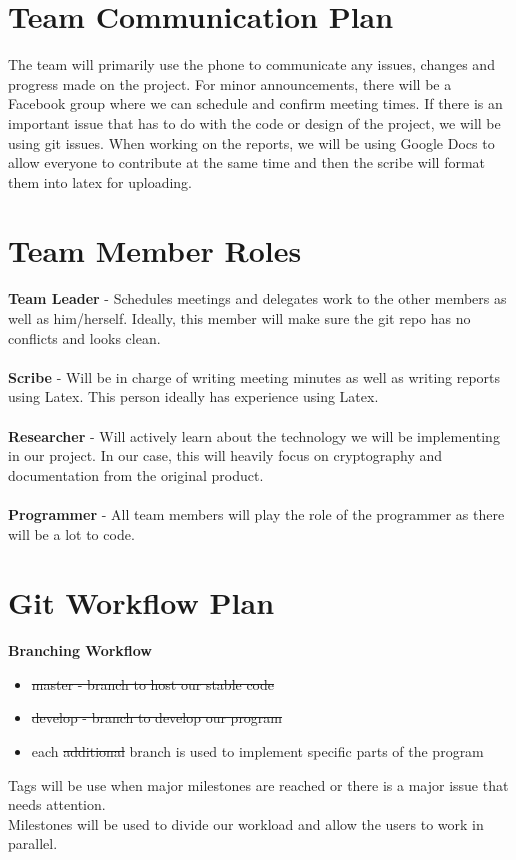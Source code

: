 \documentclass{article}
\begin{document}
\section{Team Communication Plan}

The team will primarily use the phone to communicate any issues, changes and progress made on the project. For minor announcements, there will be a Facebook group where we can schedule and confirm meeting times. If there is an important issue that has to do with the code or design of the project, we will be using git issues. When working on the reports, we will be using Google Docs to allow everyone to contribute at the same time and then the scribe will format them into latex for uploading.

\section{Team Member Roles}

\textbf{Team Leader} - Schedules meetings and delegates work to the other members as well as him/herself. Ideally, this member will make sure the git repo has no conflicts and looks clean.\\\\
\textbf{Scribe} - Will be in charge of writing meeting minutes as well as writing reports using Latex. This person ideally has experience using Latex.\\\\
\textbf{Researcher} - Will actively learn about the technology we will be implementing in our project. In our case, this will heavily focus on cryptography and documentation from the original product.\\\\
\textbf{Programmer} - All team members will play the role of the programmer as there will be a lot to code.

\section{Git Workflow Plan}

\textbf{Branching Workflow}
\begin{itemize}
    \item \sout{master - branch to host our stable code}
    \item \sout{develop - branch to develop our program}
    \item each \sout{additional} branch is used to implement specific parts of the program
\end{itemize}
Tags will be use when major milestones are reached or there is a major issue that needs attention.\\
Milestones will be used to divide our workload and allow the users to work in parallel.
\end{document}
